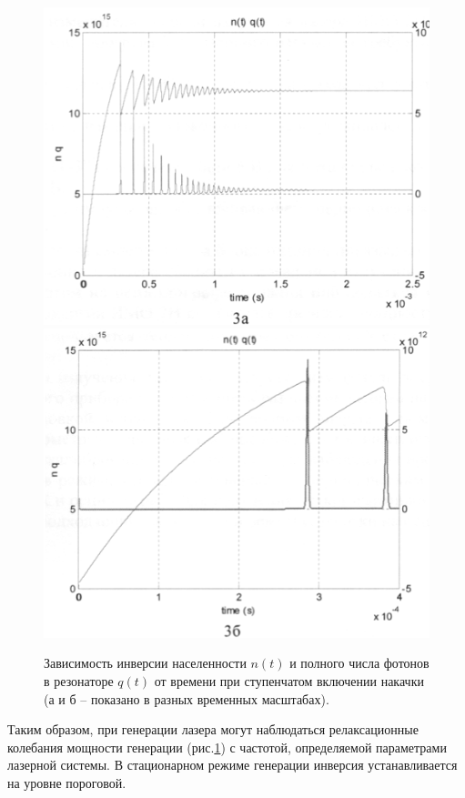 \documentclass[a4paper, 12pt]{article}
\begin{document}
	\begin{figure}[!htb]
		\centering
		\includegraphics[width=\linewidth]{3a.png}
		\endminipage\hfill
		\includegraphics[width=\linewidth]{3b.png}
		\endminipage
		\caption{Зависимость инверсии населенности $n(t)$ и полного числа фотонов в резонаторе $q(t)$ от времени при ступенчатом включении накачки (а и б – показано в разных временных масштабах).}
		\label{pic:3}
	\end{figure}
	\par
	Таким образом, при генерации лазера могут наблюдаться релаксационные колебания мощности генерации (рис.\ref{pic:3}) с частотой, определяемой параметрами лазерной системы. В стационарном режиме генерации инверсия устанавливается на уровне пороговой.
	\newpage
\end{document}

